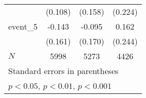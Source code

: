 {\begin{tabular}{l*{3}{c}}
            &     (0.108)         &     (0.158)         &     (0.224)         \\
[1em]
event\_5     &      -0.143         &      -0.095         &       0.162         \\
            &     (0.161)         &     (0.170)         &     (0.244)         \\
\hline
\(N\)       &        5998         &        5273         &        4426         \\
\hline\hline
\multicolumn{4}{l}{\footnotesize Standard errors in parentheses}\\
\multicolumn{4}{l}{\footnotesize \sym{*} \(p<0.05\), \sym{**} \(p<0.01\), \sym{***} \(p<0.001\)}\\
\end{tabular}
}
